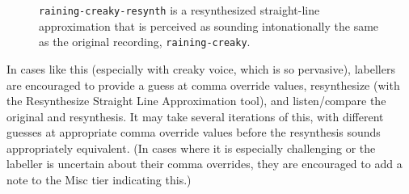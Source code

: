 \documentclass[11pt, twoside]{memoir}
\begin{document}
{{\begin{figure}[H]
\caption{\texttt{raining-creaky-resynth} is a resynthesized straight-line approximation that is perceived as sounding intonationally the same as the original recording, \texttt{raining-creaky}.
\label{fig:raining-creaky Points basic resynth}
}
\end{figure}
In cases like this (especially with creaky voice, which is so pervasive), labellers are encouraged to provide a guess at comma override values, resynthesize (with the Resynthesize Straight Line Approximation tool), and listen\slash compare the original and resynthesis. It may take several iterations of this, with different guesses at appropriate comma override values before the resynthesis sounds appropriately equivalent. (In cases where it is especially challenging or the labeller is uncertain about their comma overrides, they are encouraged to add a note to the Misc tier indicating this.) 
}}
\end{document}
